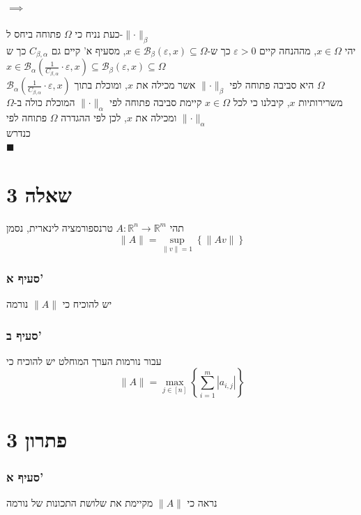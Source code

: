 \documentclass[12pt, titlepage]{article}
\begin{document}
\subsection*{$\implies$}
כעת נניח כי $\Omega$ פתוחה ביחס ל-$\lVert\cdot\rVert_\beta$\\
יהי $x\in\Omega$, מההנחה קיים $\varepsilon>0$ כך ש-$x\in\mathcal{B}_\beta\left(\varepsilon,x\right)\subseteq \Omega$, מסעיף א' קיים גם $C_{\beta,\alpha}$ כך ש $x\in\mathcal{B}_\alpha\left(\frac{1}{C_{\beta,\alpha}}\cdot\varepsilon,x\right)\subseteq\mathcal{B}_\beta\left(\varepsilon,x\right)\subseteq\Omega$\\
$\mathcal{B}_\alpha\left(\frac{1}{C_{\beta,\alpha}}\cdot\varepsilon,x\right)$ היא סביבה פתוחה לפי $\lVert \cdot \rVert_\beta$ אשר מכילה את $x$, ומוכלת בתוך $\Omega$\\
משרירותיות $x$, קיבלנו כי לכל $x\in\Omega$ קיימת סביבה פתוחה לפי $\lVert \cdot \rVert_\alpha$ המוכלת כולה ב-$\Omega$ ומכילה את $x$, לכן לפי ההגדרה $\Omega$ פתוחה לפי $\lVert \cdot \rVert_\alpha$\\
כנדרש\\
$\blacksquare$
\newpage
\part*{שאלה 3}
תהי $A:\mathbb{R}^n\to\mathbb{R}^m$ טרנספורמציה לינארית, נסמן 
\[
  \lVert A\rVert = \sup_{\lVert v\rVert=1} \left\{\lVert Av\rVert\right\}
\]
\section*{סעיף א'}
יש להוכיח כי $\lVert A\rVert$ נורמה
\section*{סעיף ב'}
עבור נורמות הערך המוחלט יש להוכיח כי
\[
  \lVert A\rVert = \max_{j\in\left[n\right]}\left\{ \sum_{i=1}^m \left|a_{i,j}\right|\right\}
\]
\part*{פתרון 3}
\section*{סעיף א'}
נראה כי $\lVert A \rVert$ מקיימת את שלושת התכונות של נורמה
\end{document}
